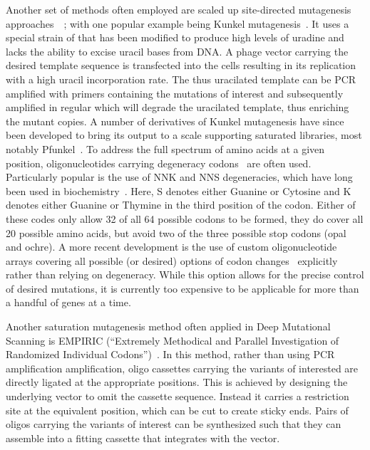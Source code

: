Another set of methods often employed are scaled up site-directed mutagenesis approaches~\cite{seyfang_multiple_2004,firnberg_pfunkel_2012,}~; with one popular example being Kunkel mutagenesis~\cite{kunkel_rapid_1985}. It uses a special strain of  that has been modified to produce high levels of uradine and lacks the ability to excise uracil bases from DNA. A phage vector carrying the desired template sequence is transfected into the cells resulting in its replication with a high uracil incorporation rate. The thus uracilated template can be PCR amplified with primers containing the mutations of interest and subsequently amplified in regular  which will degrade the uracilated template, thus enriching the mutant copies. A number of derivatives of Kunkel mutagenesis have since been developed to bring its output to a scale supporting saturated libraries, most notably Pfunkel~\cite{}.%
To address the full spectrum of amino acids at a given position, oligonucleotides carrying degeneracy codons~\cite{pal_methods_2005} are often used. Particularly popular is the use of NNK and NNS degeneracies, which have long been used in biochemistry~\cite{scott_searching_1990,barbas_semisynthetic_1992}. Here, S denotes either Guanine or Cytosine and K denotes either Guanine or Thymine in the third position of the codon. Either of these codes only allow 32 of all 64 possible codons to be formed, they do cover all 20 possible amino acids, but avoid two of the three possible stop codons (opal and ochre). A more recent development is the use of custom oligonucleotide arrays covering all possible (or desired) options of codon changes~\cite{kitzman_massively_2015} explicitly rather than relying on degeneracy. While this option allows for the precise control of desired mutations, it is currently too expensive to be applicable for more than a handful of genes at a time.

Another saturation mutagenesis method often applied in Deep Mutational Scanning is EMPIRIC (``Extremely Methodical and Parallel Investigation of Randomized Individual Codons'')~\cite{hietpas_experimental_2011}. %
In this method, rather than using PCR amplification amplification, oligo cassettes carrying the variants of interested are directly ligated at the appropriate positions. This is achieved by designing the underlying vector to omit the cassette sequence. Instead it carries a restriction site at the equivalent position, which can be cut to create sticky ends. Pairs of oligos carrying the variants of interest can be synthesized such that they can assemble into a fitting cassette that integrates with the vector.


